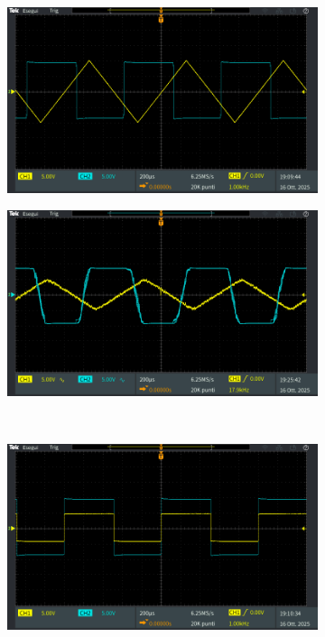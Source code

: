 \documentclass[a4paper,12pt]{article}
\begin{document}
\begin{figure}[h]
	\centering
	\begin{subfigure}{0.49\linewidth}
		\includegraphics[width = \linewidth]{immagini/schmitt/schmitt_vin_vout.png}
		\caption{}
	\end{subfigure}
	\begin{subfigure}{0.49\linewidth}
		\includegraphics[width = \linewidth]{immagini/schmitt/schmitt_vin_vout_rumoroso.png}
		\caption{}
	\end{subfigure}
	\\[0.5cm]
	\begin{subfigure}{0.49\linewidth}
		\includegraphics[width = \linewidth]{immagini/schmitt/schmitt_v+_vout.png}

\end{subfigure}
\end{figure}
\end{document}

